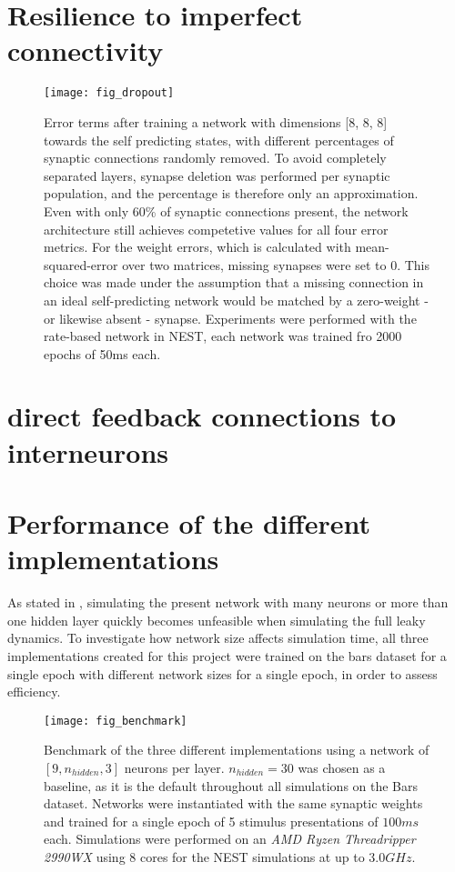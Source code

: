 \section{Resilience to imperfect connectivity}

\begin{figure}[t]
    \centering
    \texttt{[image: fig\_dropout]}
    \caption{Error terms after training a network with dimensions [8, 8, 8] towards the self predicting states, with
    different percentages of synaptic connections randomly removed. To avoid completely separated layers, synapse
    deletion was performed per synaptic population, and the percentage is therefore only an approximation. Even with
    only 60\% of synaptic connections present, the network architecture still achieves competetive values for all four
    error metrics. For the weight errors, which is calculated with mean-squared-error over two matrices, missing
    synapses were set to $0$. This choice was made under the assumption that a missing connection in an ideal
    self-predicting network would be matched by a zero-weight - or likewise absent - synapse. Experiments were performed
    with the rate-based network in NEST, each network was trained fro 2000 epochs of 50ms each.}
    \label{fig-dropout}
\end{figure}


\section{direct feedback connections to interneurons}\label{sec-electric-syns}

\cite{Vaughn2022,Mancilla2007}



\section{Performance of the different implementations}

As stated in \cite{Haider2021}, simulating the present network with many neurons or more than one hidden layer quickly
becomes unfeasible when simulating the full leaky dynamics. To investigate how network size affects simulation time, all
three implementations created for this project were trained on the bars dataset for a single epoch with different
network sizes for a single epoch, in order to assess efficiency.


\begin{figure}[t]
    \centering
    \texttt{[image: fig\_benchmark]}
    \caption{Benchmark of the three different implementations using a network of $[9, n_{hidden}, 3]$ neurons per layer.
        $n_{hidden}=30$ was chosen as a baseline, as it is the default throughout all simulations on the Bars dataset.
        Networks were instantiated with the same synaptic weights and trained for a single epoch of 5 stimulus
        presentations of $100ms$ each. Simulations were performed on an \textit{AMD Ryzen Threadripper 2990WX} using 8
        cores for the NEST simulations at up to $3.0GHz$.}
    \label{fig-benchmark}
\end{figure}

